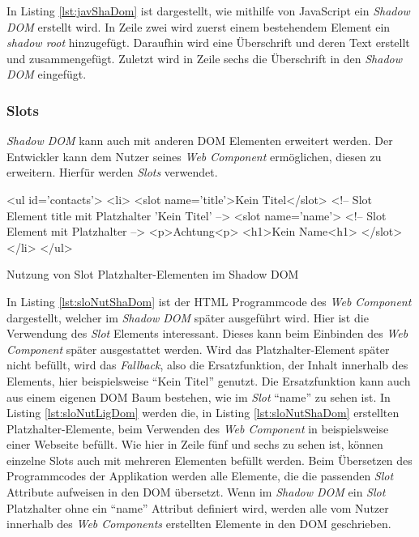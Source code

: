 \documentclass[12pt, paper=a4, bibtotoc, toc=listof, headsepline=true]{scrreprt}
\begin{document}
		In Listing \ref{lst:javShaDom} ist dargestellt, wie mithilfe von JavaScript ein \emph{Shadow \ac{DOM}} erstellt wird. In Zeile zwei wird zuerst einem bestehendem Element ein \emph{shadow root} hinzugefügt. Daraufhin wird eine Überschrift und deren Text erstellt und zusammengefügt. Zuletzt wird in Zeile sechs die Überschrift in den \emph{Shadow \ac{DOM}} eingefügt.
			\subsubsection{Slots}
			\emph{Shadow \ac{DOM}} kann auch mit anderen \ac{DOM} Elementen erweitert werden. Der Entwickler kann dem Nutzer seines \emph{Web Component} ermöglichen, diesen zu erweitern. Hierfür werden \emph{Slots} verwendet. 
			\begin{listing}
				\begin{HTMLcode*}{}
<ul id='contacts'>
   <li>
      <slot name='title'>Kein Titel</slot> <!-- Slot Element title mit Platzhalter 'Kein Titel' -->
      <slot name='name'> <!-- Slot Element mit Platzhalter -->
         <p>Achtung<p>
         <h1>Kein Name<h1>
      </slot>
   </li>
</ul>
				\end{HTMLcode*}
				\caption[Slot Elemente im Shadow DOM]{Nutzung von Slot Platzhalter-Elementen im Shadow DOM}
				\label{lst:sloNutShaDom}
			\end{listing}
			In Listing \ref{lst:sloNutShaDom} ist der \ac{HTML} Programmcode des \emph{Web Component} dargestellt, welcher im \emph{Shadow \ac{DOM}} später ausgeführt wird. Hier ist die Verwendung des \emph{Slot} Elements interessant. Dieses kann beim Einbinden des \emph{Web Component} später ausgestattet werden. Wird das Platzhalter-Element später nicht befüllt, wird das \emph{Fallback}, also die Ersatzfunktion, der Inhalt innerhalb des Elements, hier beispielsweise \enquote{Kein Titel} genutzt. Die Ersatzfunktion kann auch aus einem eigenen \ac{DOM} Baum bestehen, wie im \emph{Slot} \enquote{name} zu sehen ist\cite{Bidelman2016}. In Listing \ref{lst:sloNutLigDom} werden die, in Listing \ref{lst:sloNutShaDom} erstellten Platzhalter-Elemente, beim Verwenden des \emph{Web Component} in beispielsweise einer Webseite befüllt. Wie hier in Zeile fünf und sechs zu sehen ist, können einzelne Slots auch mit mehreren Elementen befüllt werden. Beim Übersetzen des Programmcodes der Applikation werden alle Elemente, die die passenden \emph{Slot} Attribute aufweisen in den \ac{DOM} übersetzt. Wenn im \emph{Shadow \ac{DOM}} ein \emph{Slot} Platzhalter ohne ein \enquote{name} Attribut definiert wird, werden alle vom Nutzer innerhalb des \emph{Web Components} erstellten Elemente in den \ac{DOM} geschrieben.
\end{document}
